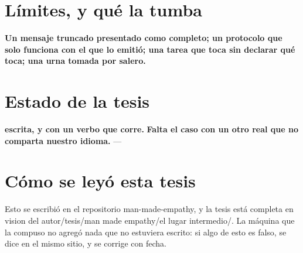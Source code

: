 \documentclass[11pt,a4paper]{article}
\begin{document}
\section{Límites, y qué la tumba}
\textbf{Un mensaje truncado presentado como completo; un protocolo que solo funciona con el que lo emitió; una tarea que toca sin declarar qué toca; una urna tomada por salero.}

\section{Estado de la tesis}
\textbf{escrita, y con un verbo que corre.} \textbf{Falta el caso con un otro real que no comparta nuestro idioma.} ---

\section*{Cómo se leyó esta tesis}
Esto se escribió en el repositorio man-made-empathy, y la tesis está completa en vision del autor/tesis/man made empathy/el lugar intermedio/. La máquina que la compuso no agregó nada que no estuviera escrito: si algo de esto es falso, se dice en el mismo sitio, y se corrige con fecha.
\end{document}
